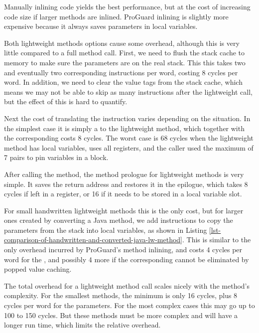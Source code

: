 Manually inlining code yields the best performance, but at the cost of increasing code size if larger methods are inlined. ProGuard inlining is slightly more expensive because it always saves parameters in local variables.

Both lightweight methods options cause some overhead, although this is very little compared to a full method call. First, we need to flush the stack cache to memory to make sure the parameters are on the real stack. This this takes two  and eventually two corresponding  instructions per word, costing 8 cycles per word. In addition, we need to clear the value tags from the stack cache, which means we may not be able to skip as many  instructions after the lightweight call, but the effect of this is hard to quantify.

Next the cost of translating the  instruction varies depending on the situation. In the simplest case it is simply a  to the lightweight method, which together with the corresponding  costs 8 cycles. The worst case is 68 cycles when the lightweight method has local variables, uses all registers, and the caller used the maximum of 7 pairs to pin variables in a  block.


After calling the method, the method prologue for lightweight methods is very simple. It saves the return address and restores it in the epilogue, which takes 8 cycles if left in a register, or 16 if it needs to be stored in a local variable slot.

For small handwritten lightweight methods this is the only cost, but for larger ones created by converting a Java method, we add  instructions to copy the parameters from the stack into local variables, as shown in Listing \ref{lst-comparison-of-handwritten-and-converted-java-lw-method}. This is similar to the only overhead incurred by ProGuard's method inlining, and costs 4 cycles per word for the , and possibly 4 more if the corresponding  cannot be eliminated by popped value caching.

The total overhead for a lightweight method call scales nicely with the method's complexity. For the smallest methods, the minimum is only 16 cycles, plus 8 cycles per word for the parameters. For the most complex cases this may go up to 100 to 150 cycles. But these methods must be more complex and will have a longer run time, which limits the relative overhead.


